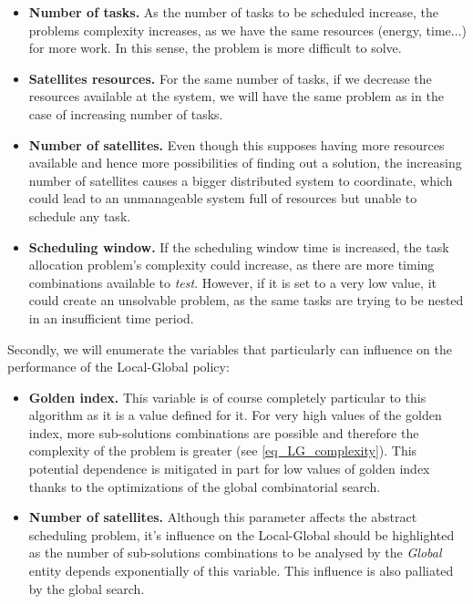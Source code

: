 \begin{itemize}
\item \textbf{Number of tasks. } As the number of tasks to be scheduled increase, the problems complexity increases, as we have the same resources (energy, time...) for more work. In this sense, the problem is more difficult to solve.

\item \textbf{Satellites resources. } For the same number of tasks, if we decrease the resources available at the system, we will have the same problem as in the case of increasing number of tasks.

\item \textbf{Number of satellites. } Even though this supposes having more resources available and hence more possibilities of finding out a solution, the increasing number of satellites causes a bigger distributed system to coordinate, which could lead to an unmanageable system full of resources but unable to schedule any task.

\item \textbf{Scheduling window. } If the scheduling window time is increased, the task allocation problem's complexity could increase, as there are more timing combinations available to \emph{test}. However, if it is set to a very low value, it could create an unsolvable problem, as the same tasks are trying to be nested in an insufficient time period.
\end{itemize}

Secondly, we will enumerate the variables that particularly can influence on the performance of the Local-Global policy:

\begin{itemize}
\item \textbf{Golden index. } This variable is of course completely particular to this algorithm as it is a value defined for it. For very high values of the golden index, more sub-solutions combinations are possible and therefore the complexity of the problem is greater (see \ref{eq_LG_complexity}). This potential dependence is mitigated in part for low values of golden index thanks to the optimizations of the global combinatorial search.

\item \textbf{Number of satellites. } Although this parameter affects the abstract scheduling problem, it's influence on the Local-Global should be highlighted as the number of sub-solutions combinations to be analysed by the \emph{Global} entity depends exponentially of this variable. This influence is also palliated by the global search.
\end{itemize}

